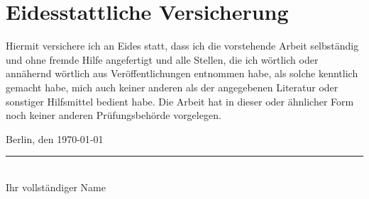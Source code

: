 \documentclass[oneside,bibliography=totocnumbered,BCOR=5mm]{scrbook}
\begin{document}
\chapter*{Eidesstattliche Versicherung}

Hiermit versichere ich an Eides statt, dass ich die vorstehende Arbeit selbständig und ohne fremde Hilfe angefertigt und alle Stellen, die ich wörtlich oder annähernd wörtlich aus Veröffentlichungen entnommen habe, als solche kenntlich gemacht habe, mich auch keiner anderen als der angegebenen Literatur oder sonstiger Hilfsmittel bedient habe. Die Arbeit hat in dieser oder ähnlicher Form noch keiner anderen Prüfungsbehörde vorgelegen.

\vspace{2cm}
\noindent Berlin, den \today

\vspace{1.5cm}
\noindent\rule{6cm}{0.4pt}\\
Ihr vollständiger Name
\end{document}
